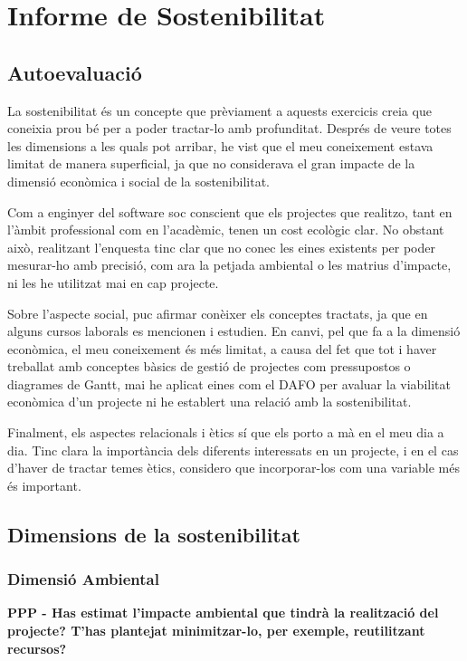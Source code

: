\documentclass[11pt,a4paper]{report}
\begin{document}
\newpage
\section{Informe de Sostenibilitat}

\subsection{Autoevaluació}

La sostenibilitat és un concepte que prèviament a aquests exercicis creia que coneixia prou bé per a poder tractar-lo amb profunditat. Després de veure totes les dimensions a les quals pot arribar, he vist que el meu coneixement estava limitat de manera superficial, ja que no considerava el gran impacte de la dimensió econòmica i social de la sostenibilitat.

Com a enginyer del software soc conscient que els projectes que realitzo, tant en l'àmbit professional com en l'acadèmic, tenen un cost ecològic clar. No obstant això, realitzant l'enquesta tinc clar que no conec les eines existents per poder mesurar-ho amb precisió, com ara la petjada ambiental o les matrius d'impacte, ni les he utilitzat mai en cap projecte.

Sobre l'aspecte social, puc afirmar conèixer els conceptes tractats, ja que en alguns cursos laborals es mencionen i estudien. En canvi, pel que fa a la dimensió econòmica, el meu coneixement és més limitat, a causa del fet que tot i haver treballat amb conceptes bàsics de gestió de projectes com pressupostos o diagrames de Gantt, mai he aplicat eines com el DAFO per avaluar la viabilitat econòmica d'un projecte ni he establert una relació amb la sostenibilitat.

Finalment, els aspectes relacionals i ètics sí que els porto a mà en el meu dia a dia. Tinc clara la importància dels diferents interessats en un projecte, i en el cas d'haver de tractar temes ètics, considero que incorporar-los com una variable més és important.

\subsection{Dimensions de la sostenibilitat}

\subsubsection{Dimensió Ambiental}

\textbf{PPP - Has estimat l'impacte ambiental que tindrà la realització del projecte? T'has plantejat minimitzar-lo, per exemple, reutilitzant recursos?}
\end{document}

